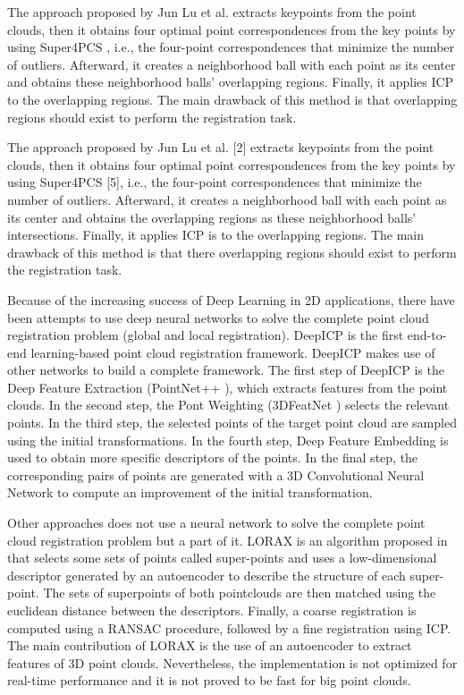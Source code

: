         The approach proposed by Jun Lu et al. \cite{Lu_2019_4pcsicp} extracts keypoints from the point clouds, 
        then it obtains four optimal point correspondences from the key points by using Super4PCS \cite{Mellado_2014_super4pcs},
        i.e., the four-point correspondences that minimize the number of outliers. 
        Afterward, it creates a neighborhood ball with each point as its center and obtains these neighborhood balls’ overlapping regions. 
        Finally, it applies ICP to the overlapping regions. 
        The main drawback of this method is that overlapping regions should exist to perform the registration task.

        The approach proposed by Jun Lu et al. [2] extracts keypoints from the point clouds, 
        then it obtains four optimal point correspondences from the key points by using Super4PCS [5], i.e., the four-point correspondences that minimize the number of outliers. 
        Afterward, it creates a neighborhood ball with each point as its center and obtains the overlapping regions as these neighborhood balls’ intersections. 
        Finally, it applies ICP is to the overlapping regions. 
        The main drawback of this method is that there overlapping regions should exist to perform the registration task.

        Because of the increasing success of Deep Learning in 2D applications, there have been attempts to use deep neural networks
        to solve the complete point cloud registration problem (global and local registration).
        DeepICP \cite{Lu_2019_deepicp} is the first end-to-end learning-based point cloud registration framework.
        DeepICP makes use of other networks to build a complete framework.
        The first step of DeepICP is the Deep Feature Extraction (PointNet++ \cite{Qi_2017_pointnet}), which extracts features from the point clouds.
        In the second step, the Pont Weighting (3DFeatNet \cite{Yew_2018_3dfeat}) selects the relevant points.
        In the third step, the selected points of the target point cloud are sampled using the initial transformations.
        In the fourth step, Deep Feature Embedding is used to obtain more specific descriptors of the points.
        In the final step, the corresponding pairs of points are generated with a 3D Convolutional Neural Network
        to compute an improvement of the initial transformation.
        
        Other approaches does not use a neural network to solve the complete point cloud registration problem but a part of it.
        LORAX is an algorithm proposed in \cite{Elbaz_2017_3dpoint} that selects some sets of points called super-points and uses a low-dimensional descriptor 
        generated by an autoencoder to describe the structure of each super-point.
        The sets of superpoints of both pointclouds are then matched using the euclidean distance between the descriptors.
        Finally, a coarse registration is computed using a RANSAC procedure, followed by a fine registration using ICP.
        The main contribution of LORAX is the use of an autoencoder to extract features of 3D point clouds. 
        Nevertheless, the implementation is not optimized for real-time performance and it is not proved to be fast for big point clouds.

